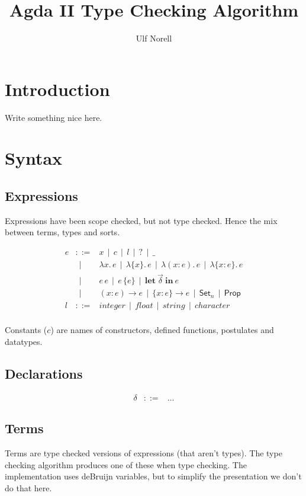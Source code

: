 \documentclass[a4paper,11pt]{article}
\title{Agda II Type Checking Algorithm}
\author{Ulf Norell}
\newcommand\keyword[1]{\mathbf{#1}}
\newcommand\Coloneqq{\mathrel{::=}}
\newcommand\OR{~~|~~}
\newcommand\Hid[1]{\{#1\}}
\newcommand\lam[1]{\lambda#1.\,}
\newcommand\hlam[1]{\lam{\Hid{#1}}}
\newcommand\tlam[2]{\lam{(#1:#2)}}
\newcommand\thlam[2]{\lam{\Hid{#1:#2}}}
\newcommand\ePi[3]{(#1:#2)\to#3}
\newcommand\ehPi[3]{\{#1:#2\}\to#3}
\newcommand\Let[2]{\keyword{let}~#1~\keyword{in}~#2}
\newcommand\Set[1]{\mathsf{Set}_{#1}}
\newcommand\Prop{\mathsf{Prop}}
\begin{document}
\maketitle

\section{Introduction}

    Write something nice here.

\section{Syntax}

\subsection{Expressions}

    Expressions have been scope checked, but not type checked. Hence the mix
    between terms, types and sorts.

    \[\begin{array}{lcl}
	e & \Coloneqq & x \OR c \OR l \OR ? \OR \_ \\
	  & \OR & \lam xe \OR \hlam xe \OR \tlam xee \OR \thlam xee \\
	  & \OR & e\,e \OR e\,\Hid e \OR \Let{\vec\delta}e \\
	  & \OR & \ePi xee \OR \ehPi xee \OR \Set n \OR \Prop \\
	l & \Coloneqq & \mathit{integer} \OR \mathit{float} \OR \mathit{string} \OR \mathit{character} \\
    \end{array}\]

    Constants ($c$) are names of constructors, defined functions, postulates and datatypes.

\subsection{Declarations}

    \[\begin{array}{lcl}
	\delta & \Coloneqq & \ldots
    \end{array}\]

\subsection{Terms}

    Terms are type checked versions of expressions (that aren't types). The
    type checking algorithm produces one of these when type checking. The
    implementation uses deBruijn variables, but to simplify the presentation
    we don't do that here.
\end{document}
